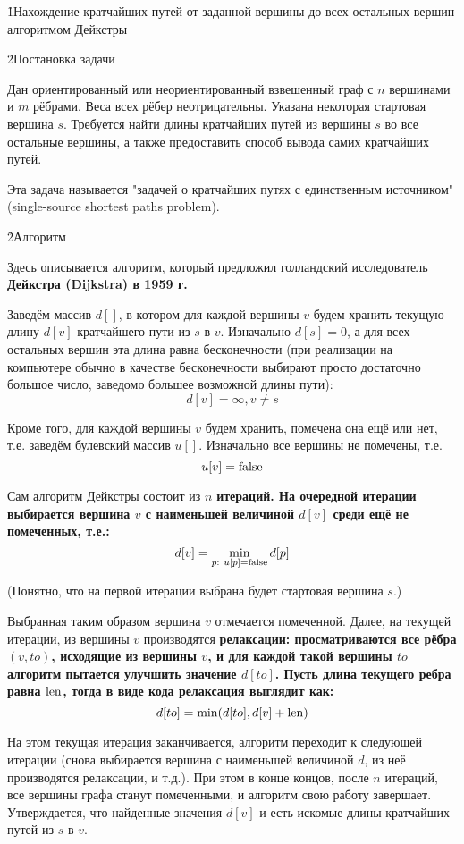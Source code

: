 \h1{Нахождение кратчайших путей от заданной вершины до всех остальных вершин алгоритмом Дейкстры}

\h2{Постановка задачи}

Дан ориентированный или неориентированный взвешенный граф с $n$ вершинами и $m$ рёбрами. Веса всех рёбер неотрицательны. Указана некоторая стартовая вершина $s$. Требуется найти длины кратчайших путей из вершины $s$ во все остальные вершины, а также предоставить способ вывода самих кратчайших путей.

Эта задача называется "задачей о кратчайших путях с единственным источником" (single-source shortest paths problem).

\h2{Алгоритм}

Здесь описывается алгоритм, который предложил голландский исследователь \bf{Дейкстра} (Dijkstra) в 1959 г.

Заведём массив $d[]$, в котором для каждой вершины $v$ будем хранить текущую длину $d[v]$ кратчайшего пути из $s$ в $v$. Изначально $d[s]=0$, а для всех остальных вершин эта длина равна бесконечности (при реализации на компьютере обычно в качестве бесконечности выбирают просто достаточно большое число, заведомо большее возможной длины пути):
$$ d[v] = \infty, v \ne s $$

Кроме того, для каждой вершины $v$ будем хранить, помечена она ещё или нет, т.е. заведём булевский массив $u[]$. Изначально все вершины не помечены, т.е.
$$ u[v] = {\rm false} $$

Сам алгоритм Дейкстры состоит из $n$ \bf{итераций}. На очередной итерации выбирается вершина $v$ с наименьшей величиной $d[v]$ среди ещё не помеченных, т.е.:
$$ d[v] = \min_{p:\ u[p]={\rm false}} d[p] $$

(Понятно, что на первой итерации выбрана будет стартовая вершина $s$.)

Выбранная таким образом вершина $v$ отмечается помеченной. Далее, на текущей итерации, из вершины $v$ производятся \bf{релаксации}: просматриваются все рёбра $(v,to)$, исходящие из вершины $v$, и для каждой такой вершины $to$ алгоритм пытается улучшить значение $d[to]$. Пусть длина текущего ребра равна $\rm len$, тогда в виде кода релаксация выглядит как:
$$ d[to] = \min (d[to], d[v] + {\rm len}) $$

На этом текущая итерация заканчивается, алгоритм переходит к следующей итерации (снова выбирается вершина с наименьшей величиной $d$, из неё производятся релаксации, и т.д.). При этом в конце концов, после $n$ итераций, все вершины графа станут помеченными, и алгоритм свою работу завершает. Утверждается, что найденные значения $d[v]$ и есть искомые длины кратчайших путей из $s$ в $v$.

